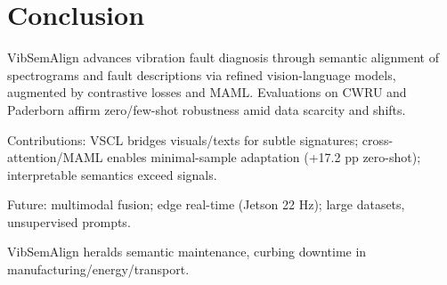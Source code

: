 \section{Conclusion}

VibSemAlign advances vibration fault diagnosis through semantic alignment of spectrograms and fault descriptions via refined vision-language models, augmented by contrastive losses and MAML. Evaluations on CWRU and Paderborn affirm zero/few-shot robustness amid data scarcity and shifts.

Contributions: VSCL bridges visuals/texts for subtle signatures; cross-attention/MAML enables minimal-sample adaptation (+17.2 pp zero-shot); interpretable semantics exceed signals.

Future: multimodal fusion; edge real-time (Jetson 22 Hz); large datasets, unsupervised prompts.

VibSemAlign heralds semantic maintenance, curbing downtime in manufacturing/energy/transport.